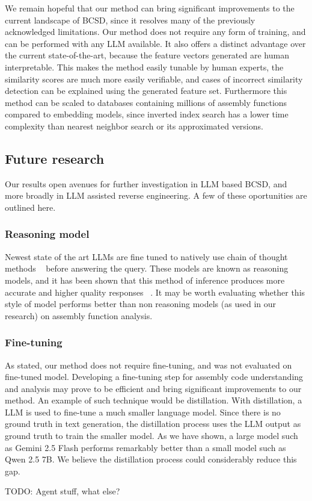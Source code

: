 \documentclass[conference,compsoc]{IEEEtran}
\begin{document}
We remain hopeful that our method can bring significant improvements to the current landscape of BCSD, since it resolves
many of the previously acknowledged limitations. Our method does not require any form of training, and can be performed with any LLM
available. It also offers a distinct advantage over the current state-of-the-art, because the feature vectors generated are human
interpretable. This makes the method easily tunable by human experts, the similarity scores are much more easily verifiable, and
cases of incorrect similarity detection can be explained using the generated feature set. Furthermore this method can be scaled to
databases containing millions of assembly functions compared to embedding models, since inverted index search has a lower time
complexity than nearest neighbor search or its approximated versions.

\subsection{Future research}

Our results open avenues for further investigation in LLM based BCSD, and more broadly in LLM assisted reverse engineering.
A few of these oportunities are outlined here.

\subsubsection{Reasoning model}

Newest state of the art LLMs are fine tuned to natively use chain of thought methods ~\cite{c-o-t} before answering the query.
These models are known as reasoning models, and it has been shown that this method of inference produces more accurate and
higher quality responses ~\cite{c-o-t,reasoning,thinking-llm}. It may be worth evaluating whether this style of model performs better than
non reasoning models (as used in our research) on assembly function analysis.

\subsubsection{Fine-tuning}

As stated, our method does not require fine-tuning, and was not evaluated on fine-tuned model. Developing a fine-tuning step
for assembly code understanding and analysis may prove to be efficient and bring significant improvements to our method.
An example of such technique would be distillation. With distillation, a LLM is used to fine-tune a much smaller language
model. Since there is no ground truth in text generation, the distillation process uses the LLM output as ground truth
to train the smaller model. As we have shown, a large model such as Gemini 2.5 Flash performs remarkably better than a
small model such as Qwen 2.5 7B. We believe the distillation process could considerably reduce this gap.

TODO: Agent stuff, what else?

\nocite{*}


\end{document}
